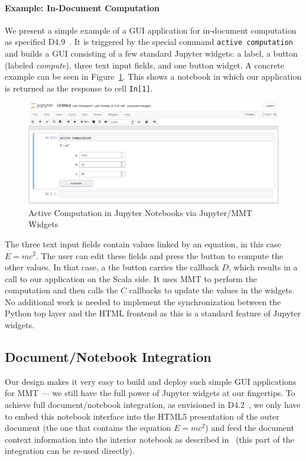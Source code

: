 \paragraph*{Example: In-Document Computation}
We present a simple example of a GUI application for in-document computation as specified D4.9~\cite{ODK-D4.9}.
It is triggered by the special command \texttt{active computation} and builds a GUI consisting of a few standard Jupyter widgets: a label, a button (labeled \textit{compute}), three text input fields, and one button widget.
A concrete example can be seen in Figure~\ref{fig:ac}.
This shows a notebook in which our application is returned as the response to cell \texttt{In[1]}.


\begin{figure}[ht]\centering
  \includegraphics[width=12cm]{activecomp}
  \caption{Active Computation in Jupyter Notebooks via Jupyter/MMT Widgets}\label{fig:ac}
\end{figure}

The three text input fields contain values linked by an equation, in this case $E=mc^2$.
The user can edit these fields and press the button to compute the other values.
In that case, a the button carries the callback $D$, which results in a call to our application on the Scala side.
It uses MMT to perform the computation and then calls the $C$ callbacks to update the values in the widgets.
No additional work is needed to implement the synchronization between the Python top layer and the HTML frontend as this is a standard feature of Jupyter widgets.
\bigskip

\subsection{Document/Notebook Integration}

Our design makes it very easy to build and deploy such simple GUI applications for MMT --- we still have the full power of Jupyter widgets at our fingertips.
To achieve full document/notebook integration, as envisioned in D4.2~\cite{ODK-D4.2}, we only have to embed this notebook interface into the HTML5 presentation of the outer document (the one that contains the equation $E=mc^2$) and feed the document context information into the interior notebook as described in~\cite{ODK-D4.9} (this part of the integration can be re-used directly).

